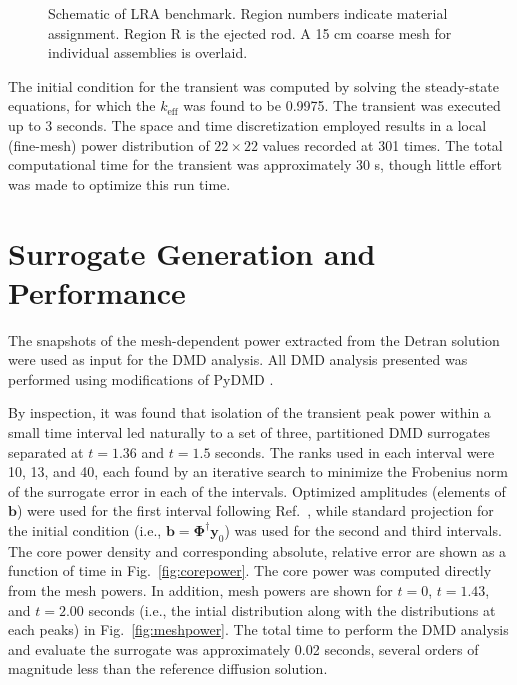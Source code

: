 \documentclass{anstrans}
\begin{document}
\begin{figure}
\caption{Schematic of LRA benchmark.  Region numbers indicate material assignment.  Region R is the  ejected rod.  A 15 cm coarse mesh for individual assemblies is overlaid.}
\label{fig:lra_core}
\end{figure}

The initial condition for the transient was computed by solving the steady-state equations, for which the $k_{\text{eff}}$ was found to be 0.9975.
The transient was executed up to 3 seconds.
The space and time discretization employed results in a local (fine-mesh) power distribution of $22 \times 22$ values recorded at 301 times.
The total computational time for the transient was approximately 30 s, though little effort was made to optimize this run time.


\section{Surrogate Generation and Performance}

The snapshots of the mesh-dependent power extracted from the Detran solution were used as input for the DMD analysis. All DMD analysis presented was performed using modifications of  PyDMD \cite{demo2018pydmd}.  
 
By inspection, it was found that isolation of the transient peak power within a small time interval led naturally to a set of three, partitioned DMD surrogates separated at $t = 1.36$ and $t = 1.5$ seconds.  The ranks used in each interval were 10, 13, and 40, each found by an iterative search to minimize the Frobenius norm of the surrogate error in each of the intervals.  Optimized amplitudes (elements of $\mathbf{b}$) were used for the first interval following Ref.~\cite{jovanovic2014sparsity}, while standard projection for the initial condition (i.e., $\mathbf{b}=\bm{\Phi}^{\dagger} \mathbf{y}_0$) was used for the second and third intervals.    The core power density and corresponding absolute, relative error are shown as a function of time in Fig.~\ref{fig:corepower}.  The core power was computed directly from the mesh powers. In addition, mesh powers are shown for $t=0$, $t=1.43$, and $t=2.00$ seconds (i.e., the intial distribution along with the distributions at each peaks) in Fig.~\ref{fig:meshpower}.  The total time to perform the DMD analysis and evaluate the surrogate was approximately 0.02 seconds, several orders of magnitude less than the reference diffusion solution.
\end{document}
